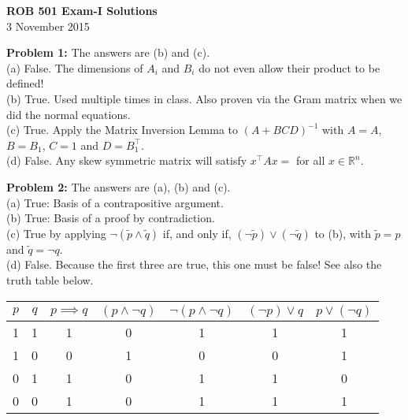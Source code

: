 \documentclass[letterpaper]{article}
\begin{document}
\newcommand{\trace}{\mathrm{trace}}
\newcommand{\real}{\mathbb R}  %
\newcommand{\nat}{\mathbb R}   %
\newcommand{\cp}{\mathbb C}    %
\newcommand{\ds}{\displaystyle}
\newcommand{\mf}[2]{\frac{\ds #1}{\ds #2}}
\newcommand{\book}[2]{{Luenberger, Page~#1, }{Prob.~#2}}
\newcommand{\spanof}[1]{\textrm{span} \{ #1 \}}
\parindent 0pt


\begin{center}
{\large \bf ROB 501 Exam-I Solutions}\\
3 November 2015
\end{center}

\vspace*{1cm}

\noindent \textbf{Problem 1:} The answers are (b) and (c). \\

(a) False. The dimensions of $A_i$ and $B_i$ do not even allow their product to be defined! \\

(b) True. Used multiple times in class. Also proven via the Gram matrix when we did the normal equations. \\

(c) True. Apply the Matrix Inversion Lemma to $(A+BCD)^{-1}$ with $A=A$, $B=B_1$, $C=1$ and $D=B_1^\top$.\\

(d) False.  Any skew symmetric matrix will satisfy $x^{\top} A x=$ for all $x \in \real^n$.



\bigskip

\noindent \textbf{Problem 2:} The answers are (a), (b) and (c). \\

(a) True: Basis of a contrapositive argument. \\

(b) True: Basis of a proof by contradiction. \\

(c) True by applying $\neg(\tilde{p} \land \tilde{q})$ if, and only if, $ (\neg \tilde{p}) \lor (\neg \tilde{q})$ to (b), with
$\tilde{p}=p$ and $\tilde{q}= \neg q$. \\

(d) False. Because the first three are true, this one must be false! See also the truth table below.


\begin{center}
\begin{tabular}{|c|c|c|c|c|c|c|}
\hline
$p$ & $q$ & $p \implies q$ & $ (p \land \neg q)$ & $ \neg (p \land \neg q)$ & $ (\neg p) \lor  q$ & $ p \lor  (\neg q)$ \\ \hline
1 & 1 & 1 & 0 & 1 & 1 & 1\\
1 & 0 & 0 & 1 & 0 & 0& 1\\
0 & 1 & 1 & 0 & 1 & 1 &0 \\
0 & 0 & 1 & 0 & 1 & 1 & 1 \\ \hline
\end{tabular}
\end{center}
\end{document}
